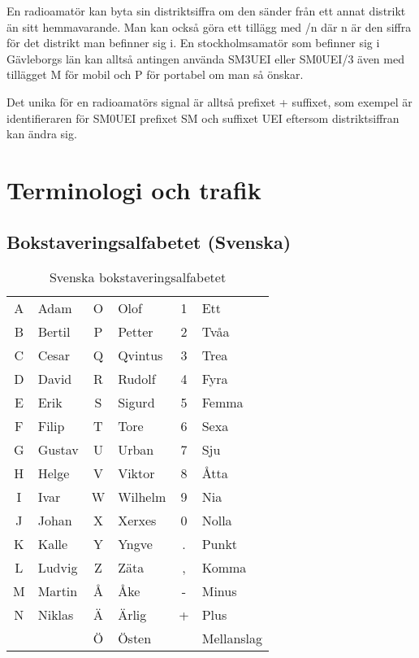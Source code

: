 En radioamatör kan byta sin distriktsiffra om den sänder från ett annat distrikt
än sitt hemmavarande. Man kan också göra ett tillägg med /n där n är den siffra
för det distrikt man befinner sig i. En stockholmsamatör som befinner sig i
Gävleborgs län kan alltså antingen använda SM3UEI eller SM0UEI/3 även med
tillägget M för mobil och P för portabel om man så önskar.

Det unika för en radioamatörs signal är alltså prefixet + suffixet, som exempel
är identifieraren för SM0UEI prefixet SM och suffixet UEI eftersom
distriktsiffran kan ändra sig.

\clearpage


\section{Terminologi och trafik}

\subsection{Bokstaveringsalfabetet (Svenska)}

\begin{table}[H]
	\centering
\begin{longtable}{cl|cl|cl }
	A & Adam   & O & Olof    & 1 & Ett        \\
	B & Bertil & P & Petter  & 2 & Tvåa       \\
	C & Cesar  & Q & Qvintus & 3 & Trea       \\
	D & David  & R & Rudolf  & 4 & Fyra       \\
	E & Erik   & S & Sigurd  & 5 & Femma      \\
	F & Filip  & T & Tore    & 6 & Sexa       \\
	G & Gustav & U & Urban   & 7 & Sju        \\
	H & Helge  & V & Viktor  & 8 & Åtta       \\
	I & Ivar   & W & Wilhelm & 9 & Nia        \\
	J & Johan  & X & Xerxes  & 0 & Nolla      \\
	K & Kalle  & Y & Yngve   & . & Punkt      \\
	L & Ludvig & Z & Zäta    & , & Komma      \\
	M & Martin & Å & Åke     & - & Minus      \\
	N & Niklas & Ä & Ärlig   & + & Plus       \\
	  &        & Ö & Östen   &   & Mellanslag \\
\end{longtable}
\caption{Svenska bokstaveringsalfabetet}
\end{table}

